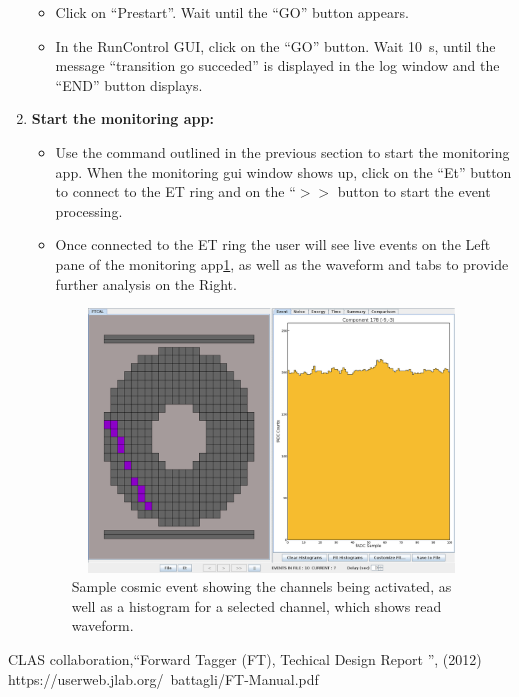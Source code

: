 \documentclass[11.5pt]{article}
\begin{document}
\begin{enumerate}
\begin{itemize}
\item{Click on ``Prestart''.  Wait until the ``GO'' button appears.}
\item{In the RunControl GUI, click on the ``GO'' button. Wait 10~s, until the message ``transition go succeded'' is displayed in the log window and the ``END'' button displays.}
\end{itemize}
\item{\textbf{Start the monitoring app: }}
\begin{itemize}
\item{Use the command outlined in the previous section to start the monitoring app. When the monitoring gui window shows up, click on the ``Et'' button to connect to the ET ring and on the ``$>>$ button to start the event processing. }
\item{Once connected to the ET ring the user will see live events on the Left pane of the monitoring app\ref{fig:CROSSING}, as well as the waveform and tabs to provide further analysis on the Right.}
\end{itemize}

\begin{figure}[htbp]\centering
  \includegraphics[width=12cm, height=7cm]{pics/Success_Successo.png}
     \caption{Sample cosmic event showing the channels being activated, as well as a histogram for a selected channel, which shows read waveform.}
       \label{fig:CROSSING}
\end{figure}

\end{enumerate}



\begin{thebibliography}{9}
\makeatletter
    \@clubpenalty \clubpenalty
\makeatother 

 CLAS collaboration,``Forward Tagger (FT), Techical Design Report '', (2012) 
 https://userweb.jlab.org/~battagli/FT-Manual.pdf
\end{thebibliography} 
\end{document}
